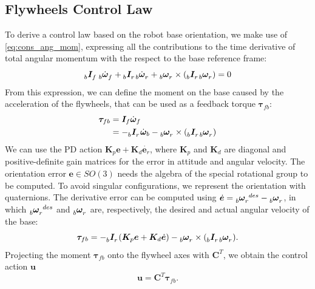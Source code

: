 \documentclass[sensors,article,submit,pdftex,moreauthors]{Definitions/mdpi}
\begin{document}
\subsection{Flywheels Control Law}
\label{subsec:control_law}
To derive a control law based on the robot base orientation, we make use of \eqref{eq:cons_ang_mom}, expressing all the contributions to the time derivative of total angular momentum with the respect to the base reference frame:
\begin{equation*}
\tensor[_b]{\bm{I}}{_f} \, \tensor[_b]{\dot{\bm{\omega}}}{_f} + \tensor[_b]{\bm{I}}{_r} \tensor[_b]{\dot{\bm{\omega}}}{_r} + \tensor[_b]{\bm{\omega}}{_r} \times \left( \tensor[_b]{\bm{I}}{_r} \tensor[_b]{\bm{\omega}}{_r}\right) = 0
\end{equation*}
From this expression, we can define the moment on the base caused by the acceleration of the flywheels, that can be used as a feedback torque $\bm{\tau}_{fb}$:
\begin{equation*}
\begin{split}
\bm{\tau}_{fb} &= \bm{I}_f \dot{\bm{\omega}}_f \\
&= - \tensor[_b]{\bm{I}}{_r} \dot{\bm{\omega}}_b - \tensor[_b]{\bm{\omega}}{_r} \times \left( \tensor[_b]{\bm{I}}{_r} \tensor[_b]{\bm{\omega}}{_r}\right)
\end{split}
\end{equation*}
We can use the PD action $\bm{K}_p \bm{e} + \bm{K}_d \dot{\bm{e}_r}$, where $\bm{K}_p$ and $\bm{K}_d$ are diagonal and positive-definite gain matrices for the error in attitude and angular velocity.
The orientation error $\bm{e} \in SO(3)$ needs the algebra of the special rotational group to be computed. To avoid singular configurations, we represent the orientation with quaternions.
The derivative error can be computed using $\dot{\bm{e}} = \tensor[_b]{\bm{\omega}}{_r^{des}} - \tensor[_b]{\bm{\omega}}{_r}$, in which $\tensor[_b]{\bm{\omega}}{_r^{des}}$ and $\tensor[_b]{\bm{\omega}}{_r}$ are, respectively, the desired and actual angular velocity of the base:
\begin{equation*}
\bm{\tau}_{fb} = - \tensor[_b]{\bm{I}}{_r} \left(\bm{K}_p \bm{e} + \bm{K}_d \dot{\bm{e}}\right) - \tensor[_b]{\bm{\omega}}{_r} \times \left( \tensor[_b]{\bm{I}}{_r} \tensor[_b]{\bm{\omega}}{_r}\right).
\end{equation*}
Projecting the moment $\bm{\tau}_{fb}$ onto the flywheel axes with $\bm{C}^T$, we obtain the control action $\bm{u}$
\begin{equation}
\label{eq:ctrl_law}
\bm{u} = \bm{C}^T \bm{\tau}_{fb}.
\end{equation}
\end{document}
